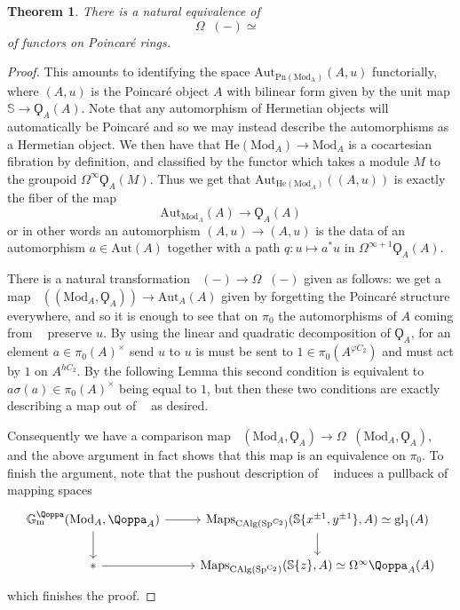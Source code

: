 \documentclass{article}
\DeclareMathOperator{\CAlg}{CAlg} %
\DeclareMathOperator{\Picp}{Pic^p} %
\DeclareMathOperator{\gmq}{\mathbb{G}_m^\Qoppa}
\renewcommand{\phi}{\varphi}
\newtheorem{theorem}[equation]{Theorem}
\theoremstyle{definition}
\begin{document}
\begin{theorem}\label{theorem:loops_Poincare_pic_is_Gm_Qoppa}
	There is a natural equivalence of \[\Omega \Picp(-)\simeq \gmq\] of functors on Poincar{\'e} rings.
\end{theorem}
\begin{proof}
	This amounts to identifying the space $\mathrm{Aut}_{\mathrm{Pn(\mathrm{Mod}_A)}}(A,u)$ functorially, where $(A,u)$ is the Poincar{\'e} object $A$ with bilinear form given by the unit map $\mathbb{S}\to \Qoppa_A(A)$. Note that any automorphism of Hermetian objects will automatically be Poincar{\'e} and so we may instead describe the automorphisms as a Hermetian object. We then have that $\mathrm{He}(\mathrm{Mod}_A)\to \mathrm{Mod}_A$ is a cocartesian fibration by definition, and classified by the functor which takes a module $M$ to the groupoid $\Omega^\infty \Qoppa_A(M)$. Thus we get that $\mathrm{Aut}_{\mathrm{He}(\mathrm{Mod}_A)}((A,u))$ is exactly the fiber of the map \[\mathrm{Aut}_{\mathrm{Mod}_A}(A)\to \Qoppa_A(A)\] or in other words an automorphism $(A,u)\to (A,u)$ is the data of an automorphism $a\in \mathrm{Aut}(A)$ together with a path $q:u\mapsto a^*u$ in $\Omega^{\infty +1}\Qoppa_A(A)$.  
	
	There is a natural transformation $\gmq(-)\to \Omega\Picp(-)$ given as follows: we get a map $\gmq((\mathrm{Mod}_A, \Qoppa_A))\to \mathrm{Aut}_A(A)$ given by forgetting the Poincar{\'e} structure everywhere, and so it is enough to see that on $\pi_0$ the automorphisms of $A$ coming from $\gmq$ preserve $u$. By using the linear and quadratic decomposition of $\Qoppa_A$, for an element $a\in \pi_0(A)^\times$ send $u$ to $u$ is must be sent to $1\in \pi_0(A^{\phi C_2})$ and must act by $1$ on $A^{hC_2}$. By the following Lemma this second condition is equivalent to $a\sigma(a)\in \pi_0(A)^\times$ being equal to $1$, but then these two conditions are exactly describing a map out of $\gmq$ as desired. 
	
	Consequently we have a comparison map $\gmq(\mathrm{Mod}_A, \Qoppa_A)\to \Omega\Picp(\mathrm{Mod}_A,\Qoppa_A)$, and the above argument in fact shows that this map is an equivalence on $\pi_0$. To finish the argument, note that the pushout description of $\gmq$ induces a pullback of mapping spaces 
	\[
	\begin{tikzcd}
		\gmq(\mathrm{Mod}_A, \Qoppa_A) \ar[d] \ar[r] & \mathrm{Maps}_{\CAlg(\mathrm{Sp}^{C_2})}(\mathbb{S}\{x^{\pm 1}, y^{\pm 1}\}, A)\simeq \mathrm{gl}_1(A)\ar[d]\\
		* \ar[r] & \mathrm{Maps}_{\CAlg(\mathrm{Sp^{C_2}})}(\mathbb{S}\{z\},A)\simeq \Omega^\infty\Qoppa_A(A) 
	\end{tikzcd}
	\] which finishes the proof.
\end{proof}
\end{document}
